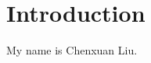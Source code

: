 \hypertarget{index_intro_sec}{}\section{Introduction}\label{index_intro_sec}
My name is Chenxuan Liu. 